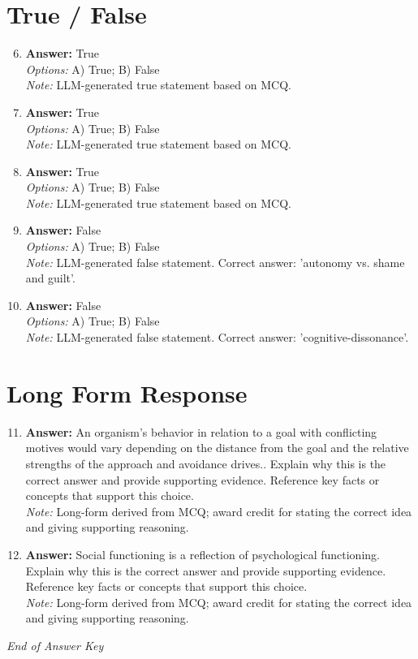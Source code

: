 \documentclass[12pt]{article}
\begin{document}
\section*{True / False}
\begin{enumerate}[label=\arabic*.]
\setcounter{enumi}{5}
\item \textbf{Answer:} True
\\ \textit{Options:} A) True; B) False
\\ \textit{Note:} LLM-generated true statement based on MCQ.
\item \textbf{Answer:} True
\\ \textit{Options:} A) True; B) False
\\ \textit{Note:} LLM-generated true statement based on MCQ.
\item \textbf{Answer:} True
\\ \textit{Options:} A) True; B) False
\\ \textit{Note:} LLM-generated true statement based on MCQ.
\item \textbf{Answer:} False
\\ \textit{Options:} A) True; B) False
\\ \textit{Note:} LLM-generated false statement. Correct answer: 'autonomy vs. shame and guilt'.
\item \textbf{Answer:} False
\\ \textit{Options:} A) True; B) False
\\ \textit{Note:} LLM-generated false statement. Correct answer: 'cognitive-dissonance'.
\end{enumerate}

\section*{Long Form Response}
\begin{enumerate}[label=\arabic*.]
\setcounter{enumi}{10}
\item \textbf{Answer:} An organism's behavior in relation to a goal with conflicting motives would vary depending on the distance from the goal and the relative strengths of the approach and avoidance drives.. Explain why this is the correct answer and provide supporting evidence. Reference key facts or concepts that support this choice.
\\ \textit{Note:} Long-form derived from MCQ; award credit for stating the correct idea and giving supporting reasoning.
\item \textbf{Answer:} Social functioning is a reflection of psychological functioning. Explain why this is the correct answer and provide supporting evidence. Reference key facts or concepts that support this choice.
\\ \textit{Note:} Long-form derived from MCQ; award credit for stating the correct idea and giving supporting reasoning.
\end{enumerate}

\vfill
\noindent\textit{End of Answer Key}
\end{document}
